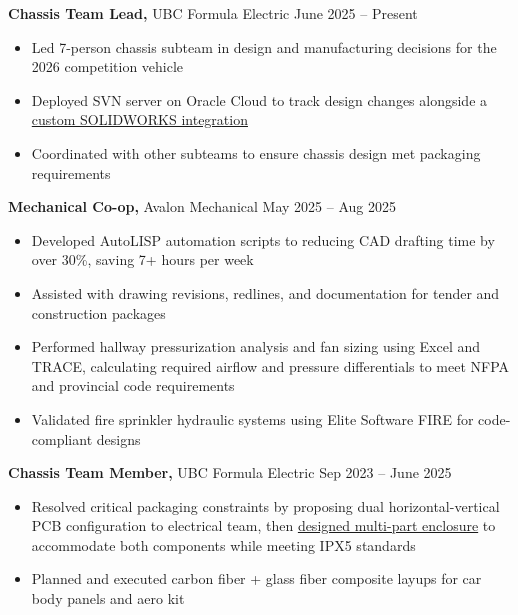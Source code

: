 \documentclass[11pt]{article}       %
\begin{document}
\textbf{Chassis Team Lead,} {UBC Formula Electric} \hfill June 2025 -- Present \\
\vspace{-8.5pt}
\begin{itemize}
  \item Led 7-person chassis subteam in design and manufacturing decisions for the 2026 competition vehicle
  \item Deployed SVN server on Oracle Cloud to track design changes alongside a \href{https://www.danielrbenjamin.com/projects/svnworks.html}{custom SOLIDWORKS integration}
  \item Coordinated with other subteams to ensure chassis design met packaging requirements
\end{itemize}

\textbf{Mechanical Co-op,} {Avalon Mechanical} \hfill May 2025 -- Aug 2025 \\
\vspace{-8.5pt}
\begin{itemize}
  \item Developed AutoLISP automation scripts to  reducing CAD drafting time by over 30\%, saving 7+ hours per week
  \item Assisted with drawing revisions, redlines, and documentation for tender and construction packages
  \item Performed hallway pressurization analysis and fan sizing using Excel and TRACE, calculating required airflow and pressure differentials to meet NFPA and provincial code requirements
  \item Validated fire sprinkler hydraulic systems using Elite Software FIRE for code-compliant designs
\end{itemize}

\textbf{Chassis Team Member,} {UBC Formula Electric} \hfill Sep 2023 -- June 2025 \\
\vspace{-8.5pt}
\begin{itemize}
  \item Resolved critical packaging constraints by proposing dual horizontal-vertical PCB configuration to electrical team, then \href{https://www.danielrbenjamin.com/projects/formula.html}{designed multi-part enclosure} to accommodate both components while meeting IPX5 standards
  \item Planned and executed carbon fiber + glass fiber composite layups for car body panels and aero kit
\end{itemize}
\end{document}
